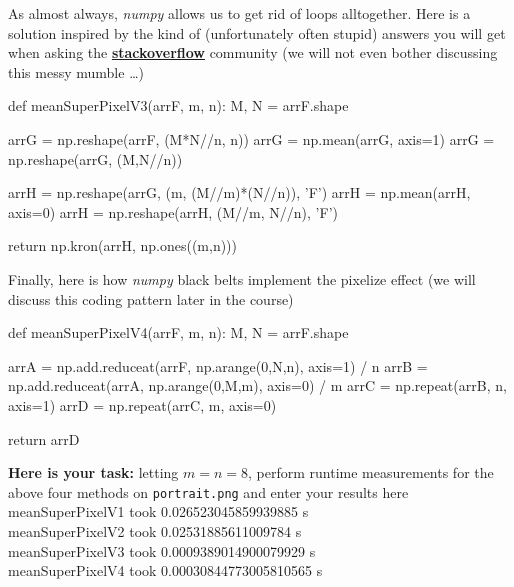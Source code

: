 As almost always, \emph{numpy} allows us to get rid of  loops alltogether. Here is a solution inspired by the kind of (unfortunately often stupid) answers you will get when asking the \href{https://stackoverflow.com/questions/14229029/block-mean-of-numpy-2d-array}{\textbf{stackoverflow}} community (we will not even bother discussing this messy mumble \ldots)

\begin{python}[emph={meanSuperPixelV1,meanSuperPixelV2,meanSuperPixelV3,meanSuperPixelV4}]
def meanSuperPixelV3(arrF, m, n):
    M, N = arrF.shape

    arrG = np.reshape(arrF, (M*N//n, n))
    arrG = np.mean(arrG, axis=1)
    arrG = np.reshape(arrG, (M,N//n))

    arrH = np.reshape(arrG, (m, (M//m)*(N//n)), 'F')
    arrH = np.mean(arrH, axis=0)
    arrH = np.reshape(arrH, (M//m, N//n), 'F')

    return np.kron(arrH, np.ones((m,n)))
\end{python}    

Finally, here is how \emph{numpy} black belts implement the pixelize effect (we will discuss this coding pattern later in the course)
\begin{python}[emph={meanSuperPixelV1,meanSuperPixelV2,meanSuperPixelV3,meanSuperPixelV4}]   
def meanSuperPixelV4(arrF, m, n):
    M, N = arrF.shape

    arrA = np.add.reduceat(arrF, np.arange(0,N,n), axis=1) / n
    arrB = np.add.reduceat(arrA, np.arange(0,M,m), axis=0) / m
    arrC = np.repeat(arrB, n, axis=1)
    arrD = np.repeat(arrC, m, axis=0)
    
    return arrD
\end{python}

\textbf{Here is your task:} letting $m=n=8$,  perform runtime measurements for the above four methods on \texttt{portrait.png} and enter your results here
\color{blue} \\[1ex]
meanSuperPixelV1 took 0.026523045859939885 s \\
meanSuperPixelV2 took 0.02531885611009784 s \\
meanSuperPixelV3 took 0.0009389014900079929 s \\
meanSuperPixelV4 took 0.00030844773005810565 s
\color{black}




